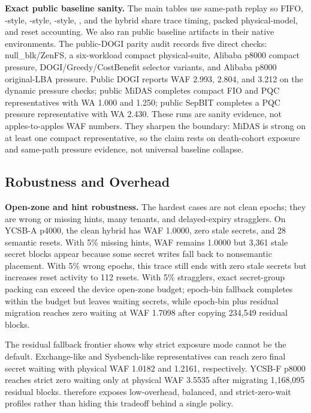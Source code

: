 \noindent\textbf{Exact public baseline sanity.}
The main tables use same-path replay so FIFO, \sepbit-style, \midas-style, \dogi-style, \system, and the hybrid share trace timing, packed physical-\zns model, and reset accounting.  We also ran public baseline artifacts in their native environments.  The public-DOGI parity audit records five direct checks: null\_blk/ZenFS, a six-workload compact physical-\zns suite, Alibaba p8000 compact pressure, DOGI/Greedy/CostBenefit selector variants, and Alibaba p8000 original-LBA pressure.  Public DOGI reports WAF 2.993, 2.804, and 3.212 on the dynamic pressure checks; public MiDAS completes compact FIO and PQC representatives with WA 1.000 and 1.250; public SepBIT completes a PQC pressure representative with WA 2.430.  These runs are sanity evidence, not apples-to-apples WAF numbers.  They sharpen the boundary: MiDAS is strong on at least one compact representative, so the claim rests on death-cohort exposure and same-path pressure evidence, not universal baseline collapse.

\subsection{Robustness and Overhead}

\noindent\textbf{Open-zone and hint robustness.}
The hardest \system cases are not clean epochs; they are wrong or missing hints, many tenants, and delayed-expiry stragglers.  On YCSB-A p4000, the clean hybrid has WAF 1.0000, zero stale secrets, and 28 semantic resets.  With 5\% missing hints, WAF remains 1.0000 but 3,361 stale secret blocks appear because some secret writes fall back to nonsemantic placement.  With 5\% wrong epochs, this trace still ends with zero stale secrets but increases reset activity to 112 resets.  With 5\% stragglers, exact secret-group packing can exceed the device open-zone budget; epoch-bin fallback completes within the budget but leaves waiting secrets, while epoch-bin plus residual migration reaches zero waiting at WAF 1.7098 after copying 234,549 residual blocks.

The residual fallback frontier shows why strict exposure mode cannot be the default.  Exchange-like and Sysbench-like representatives can reach zero final secret waiting with physical WAF 1.0182 and 1.2161, respectively.  YCSB-F p8000 reaches strict zero waiting only at physical WAF 3.5535 after migrating 1,168,095 residual blocks.  \system therefore exposes low-overhead, balanced, and strict-zero-wait profiles rather than hiding this tradeoff behind a single policy.


